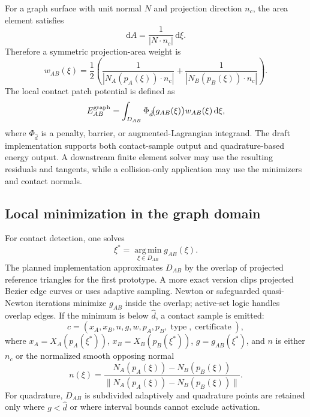 \documentclass[preprint,12pt]{elsarticle}
\newcommand{\dd}{\mathrm{d}}
\newcommand{\argmin}{\operatorname*{arg\,min}}
\begin{document}
For a graph surface with unit normal $N$ and projection direction $n_c$, the area element satisfies
\begin{equation}
    \dd A = \frac{1}{|N\cdot n_c|}\,\dd \xi.
    \label{eq:area_weight}
\end{equation}
Therefore a symmetric projection-area weight is
\begin{equation}
    w_{AB}(\xi)=\frac{1}{2}
    \left(
    \frac{1}{|N_A(p_A(\xi))\cdot n_c|}
    +
    \frac{1}{|N_B(p_B(\xi))\cdot n_c|}
    \right).
    \label{eq:symmetric_weight}
\end{equation}
The local contact patch potential is defined as
\begin{equation}
    E_{AB}^{\rm graph}
    =\int_{D_{AB}}
    \Phi_{\hat d}\!\big(g_{AB}(\xi)\big)
    w_{AB}(\xi)\,\dd \xi,
    \label{eq:graph_energy}
\end{equation}
where $\Phi_{\hat d}$ is a penalty, barrier, or augmented-Lagrangian integrand. The draft implementation supports both contact-sample output and quadrature-based energy output. A downstream finite element solver may use the resulting residuals and tangents, while a collision-only application may use the minimizers and contact normals.

\subsection{Local minimization in the graph domain}

For contact detection, one solves
\begin{equation}
    \xi^*=\argmin_{\xi\in D_{AB}} g_{AB}(\xi).
    \label{eq:xi_min}
\end{equation}
The planned implementation approximates $D_{AB}$ by the overlap of projected reference triangles for the first prototype. A more exact version clips projected Bezier edge curves or uses adaptive sampling. Newton or safeguarded quasi-Newton iterations minimize $g_{AB}$ inside the overlap; active-set logic handles overlap edges. If the minimum is below $\hat d$, a contact sample is emitted:
\begin{equation}
    c=(x_A,x_B,n,g,w,p_A,p_B,\operatorname{type},\operatorname{certificate} ),
\end{equation}
where $x_A=X_A(p_A(\xi^*))$, $x_B=X_B(p_B(\xi^*))$, $g=g_{AB}(\xi^*)$, and $n$ is either $n_c$ or the normalized smooth opposing normal
\begin{equation}
    n(\xi)=\frac{N_A(p_A(\xi))-N_B(p_B(\xi))}{\|N_A(p_A(\xi))-N_B(p_B(\xi))\|}.
\end{equation}
For quadrature, $D_{AB}$ is subdivided adaptively and quadrature points are retained only where $g<\hat d$ or where interval bounds cannot exclude activation.
\end{document}

